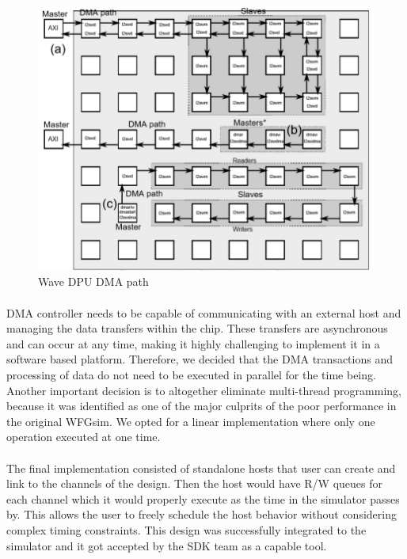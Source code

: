 \begin{figure}[H]
    \centering
    \includegraphics[trim=0cm 0cm 0cm 0cm, clip=true,scale=0.5]{figures/dma_path.jpg}
    \caption{Wave DPU DMA path\label{Fig:dmapath}}\vspace{-4mm}
    \end{figure}

\paragraph{}
DMA controller needs to be capable of communicating with an external host and managing the data transfers within the chip. These transfers are asynchronous and can occur at any time, making it highly challenging to implement it in a software based platform. Therefore, we decided that the DMA transactions and processing of data do not need to be executed in parallel for the time being. Another important decision is to altogether eliminate multi-thread programming, because it was identified as one of the major culprits of the poor performance in the original WFGsim. We opted for a linear implementation where only one operation executed at one time.

\paragraph{}
The final implementation consisted of standalone hosts that user can create and link to the channels of the design. Then the host would have R/W queues for each channel which it would properly execute as the time in the simulator passes by. This allows the user to freely schedule the host behavior without considering complex timing constraints. This design was successfully integrated to the simulator and it got accepted by the SDK team as a capable tool.

